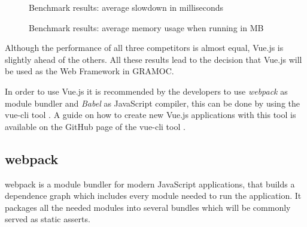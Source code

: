 \begin{figure}[H]
    \centering
    \caption{Benchmark results: average slowdown in milliseconds}
    \label{fig:slowdownresults}
\end{figure}

\begin{figure}[H]
    \centering
    \caption{Benchmark results: average memory usage when running in MB}
    \label{fig:memoryresults}
\end{figure}

Although the performance of all three competitors is almost equal, Vue.js is slightly ahead of the others. All these results lead to the decision that Vue.js will be used as the Web Framework in GRAMOC.

In order to use Vue.js it is recommended by the developers to use \textit{webpack}  as module bundler and \textit{Babel} as JavaScript compiler, this can be done by using the vue-cli tool \autocite{webpack, Babel, vuecli}. A guide on how to create new Vue.js applications with this tool is available on the GitHub page of the vue-cli tool \autocite{vuecli}.

\subsection{webpack}
webpack is a module bundler for modern JavaScript applications, that builds a dependence graph which includes every module needed to run the application. It packages all the needed modules into several bundles which will be commonly served as static asserts.

